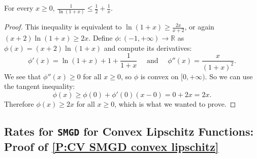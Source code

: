 \documentclass[10pt]{article} %
\let\temp\phi
\let\phi\varphi
\let\varphi\temp
\newcommand{\SMGD}{\texttt{SMGD}}
\begin{document}
\begin{lemma}\label{L:log inequality 1/2}
    For every $x \geq 0$, $\frac{1}{\ln(1+x)} \leq \frac{1}{2} + \frac{1}{x}$.
\end{lemma}

\begin{proof}
    This inequality is equivalent to $\ln(1+x) \geq \frac{2x}{x+2}$, or again $(x+2)\ln(1+x) \geq 2x$.
    Define $\varphi : (-1,+\infty) \to \mathbb{R}$ as $\varphi(x) = (x+2)\ln(1+x)$ and compute its derivatives:
    \begin{equation*}
        \varphi'(x) = \ln(1+x) +1+\frac{1}{1+x} 
        \quad \text{ and } \quad 
        \varphi''(x) = \frac{x}{(1+x)^2}.
    \end{equation*}
    We see that $\varphi''(x) \geq 0$ for all $x \geq 0$, so $\varphi$ is convex on $[0,+\infty)$.
    So we can use the tangent inequality:
    \begin{equation}
        \varphi(x) \geq \varphi(0) + \varphi'(0)(x-0) = 0 + 2x = 2x.
    \end{equation}
    Therefore $\varphi(x) \geq 2x$ for all $x \geq 0$, which is what we wanted to prove.
\end{proof}




\subsection{Rates for \SMGD{}  for Convex Lipschitz Functions: Proof of \cref{P:CV SMGD convex lipschitz} }



\CVSMGDconvexlipschitz*
\end{document}
